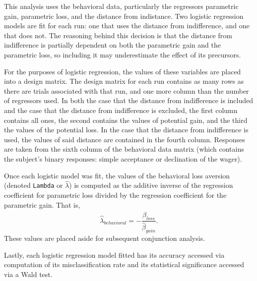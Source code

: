 
\par This analysis uses the behavioral data, particularly the regressors
parametric gain, parametric loss, and the distance from indistance. Two logistic
regression models are fit for each run: one that uses the distance from
indifference, and one that does not. The reasoning behind this decision is that
the distance from indifference is partially dependent on both the parametric
gain and the parametric loss, so including it may underestimate the effect of
its precursors.

\par \indent For the purposes of logistic regression, the values of these
variables are placed into a design matrix. The design matrix for each run
contains as many rows as there are trials associated with that run, and one more
column than the number of regressors used. In both the case that the distance
from indifference is included and the case that the distance from indifference
is excluded, the first column contains all ones, the second contains the values
of potential gain, and the third the values of the potential loss. In the case
that the distance from indifference is used, the values of said distance are
contained in the fourth column. Responses are taken from the sixth column of the
behavioral data matrix (which contains the subject's binary responses: simple
acceptance or declination of the wager).

\par \indent Once each logistic model was fit, the values of the behavioral loss
aversion (denoted \texttt{Lambda} or $\hat{ \lambda }$) is computed as the
additive inverse of the regression coefficient for parametric loss divided by
the regression coefficient for the parametric gain. That is,
\[
\hat{ \lambda }_{ behavioral } =
-\frac{ \hat{ \beta }_{ loss } }{ \hat{ \beta }_{ gain } }.
\]
These values are placed aside for subsequent conjunction analysis.

\par \indent Lastly, each logistic regression model fitted has its accuracy 
accessed via computation of its misclassification rate and its statistical
significance accessed via a Wald test.
